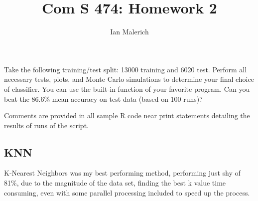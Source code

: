 \documentclass{jhwhw}
\author{Ian Malerich}
\title{Com S 474: Homework 2}
\begin{document}
\raggedright

\problem{}

    Take the following training/test split: 13000 training and 6020 test. Perform all
    necessary tests, plots, and Monte Carlo simulations to determine your final choice of classifier.
    You can use the built-in function of your favorite program. Can you beat the 86.6\% mean accuracy
    on test data (based on 100 runs)?

\solution

    Comments are provided in all sample R code near print statements detailing
    the results of runs of the script. \\

    \subsection*{KNN}
    K-Nearest Neighbors was my best performing method, performing just shy of 81\%,
    due to the magnitude of the data set, finding the best k value time consuming,
    even with some parallel processing included to speed up the process.
    \inputminted[linenos,frame=lines,framesep=2mm]{R}{knn.R}
\end{document}
